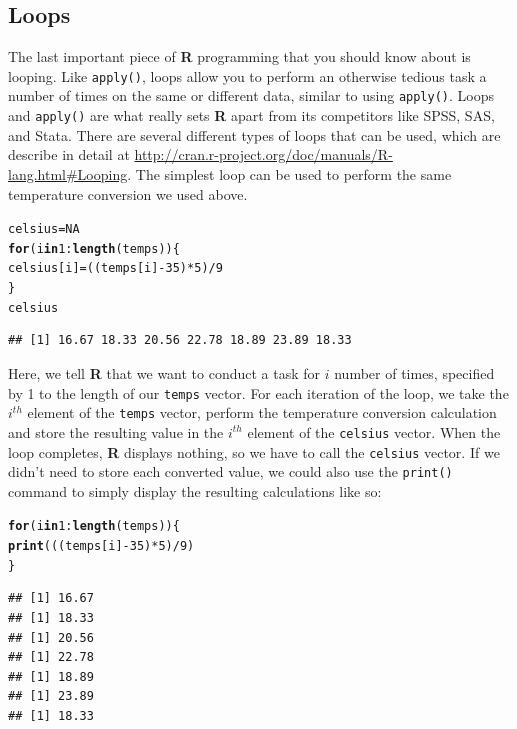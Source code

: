 \documentclass[12pt]{article}\usepackage[]{graphicx}\usepackage[]{color}
\makeatletter
\newcommand{\hlnum}[1]{\textcolor[rgb]{0.686,0.059,0.569}{#1}}%
\newcommand{\hlopt}[1]{\textcolor[rgb]{0,0,0}{#1}}%
\newcommand{\hlstd}[1]{\textcolor[rgb]{0.345,0.345,0.345}{#1}}%
\newcommand{\hlkwa}[1]{\textcolor[rgb]{0.161,0.373,0.58}{\textbf{#1}}}%
\newcommand{\hlkwb}[1]{\textcolor[rgb]{0.69,0.353,0.396}{#1}}%
\newcommand{\hlkwd}[1]{\textcolor[rgb]{0.737,0.353,0.396}{\textbf{#1}}}%
\newenvironment{kframe}{%
 \def\at@end@of@kframe{}%
 \ifinner\ifhmode%
  \def\at@end@of@kframe{\end{minipage}}%
  \begin{minipage}{\columnwidth}%
 \fi\fi%
 \def\FrameCommand##1{\hskip\@totalleftmargin \hskip-\fboxsep
 \colorbox{shadecolor}{##1}\hskip-\fboxsep
     \hskip-\linewidth \hskip-\@totalleftmargin \hskip\columnwidth}%
 \MakeFramed {\advance\hsize-\width
   \@totalleftmargin\z@ \linewidth\hsize
   \@setminipage}}%
 {\par\unskip\endMakeFramed%
 \at@end@of@kframe}
\newenvironment{knitrout}{}{} %
\makeatother
\begin{document}
\subsection{Loops}
The last important piece of \textbf{R} programming that you should know about is looping. Like \verb|apply()|, loops allow you to perform an otherwise tedious task a number of times on the same or different data, similar to using \verb|apply()|. Loops and \verb|apply()| are what really sets \textbf{R} apart from its competitors like SPSS, SAS, and Stata. There are several different types of loops that can be used, which are describe in detail at \url{http://cran.r-project.org/doc/manuals/R-lang.html#Looping}. The simplest loop can be used to perform the same temperature conversion we used above.
\begin{knitrout}
\color{fgcolor}\begin{kframe}
\begin{alltt}
\hlstd{celsius} \hlkwb{=} \hlnum{NA}
\hlkwa{for} \hlstd{(i} \hlkwa{in} \hlnum{1}\hlopt{:}\hlkwd{length}\hlstd{(temps)) \{}
    \hlstd{celsius[i]} \hlkwb{=} \hlstd{((temps[i]} \hlopt{-} \hlnum{35}\hlstd{)} \hlopt{*} \hlnum{5}\hlstd{)}\hlopt{/}\hlnum{9}
\hlstd{\}}
\hlstd{celsius}
\end{alltt}
\begin{verbatim}
## [1] 16.67 18.33 20.56 22.78 18.89 23.89 18.33
\end{verbatim}
\end{kframe}
\end{knitrout}

Here, we tell \textbf{R} that we want to conduct a task for $i$ number of times, specified by 1 to the length of our \verb|temps| vector. For each iteration of the loop, we take the $i^{th}$ element of the \verb|temps| vector, perform the temperature conversion calculation and store the resulting value in the $i^{th}$ element of the \verb|celsius| vector. When the loop completes, \textbf{R} displays nothing, so we have to call the \verb|celsius| vector. If we didn't need to store each converted value, we could also use the \verb|print()| command to simply display the resulting calculations like so:
\begin{knitrout}
\color{fgcolor}\begin{kframe}
\begin{alltt}
\hlkwa{for} \hlstd{(i} \hlkwa{in} \hlnum{1}\hlopt{:}\hlkwd{length}\hlstd{(temps)) \{}
    \hlkwd{print}\hlstd{(((temps[i]} \hlopt{-} \hlnum{35}\hlstd{)} \hlopt{*} \hlnum{5}\hlstd{)}\hlopt{/}\hlnum{9}\hlstd{)}
\hlstd{\}}
\end{alltt}
\begin{verbatim}
## [1] 16.67
## [1] 18.33
## [1] 20.56
## [1] 22.78
## [1] 18.89
## [1] 23.89
## [1] 18.33
\end{verbatim}
\end{kframe}
\end{knitrout}
\end{document}
